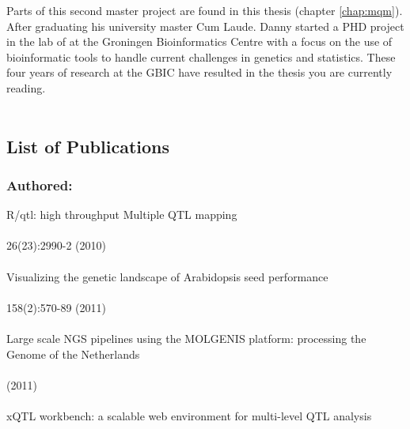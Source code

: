 Parts of this second master project are found in this thesis (chapter \ref{chap:mqm}).
After graduating his university master Cum Laude. Danny started a PHD project in the lab of  at the Groningen Bioinformatics Centre with a focus on the use of bioinformatic 
tools to handle current challenges in genetics and statistics. These four years of research 
at the GBIC have resulted in the thesis you are currently reading.\\\\

\newpage

\subsection{List of Publications}

\subsubsection*{Authored:}
   R/qtl: high throughput Multiple QTL mapping\\
  \\
   26(23):2990-2 (2010)\\\\
  Visualizing the genetic landscape of Arabidopsis seed performance\\
  \\
   158(2):570-89 (2011)\\\\
  Large scale NGS pipelines using the MOLGENIS platform: processing the Genome of the Netherlands\\
  \\
   (2011)\\\\
  xQTL workbench: a scalable web environment for multi-level QTL analysis\\
  \\
